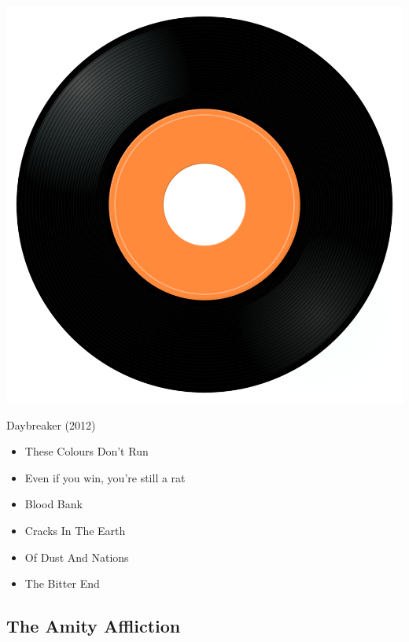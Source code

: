 \begin{minipage}[t]{0.25\textwidth}\vspace{0pt}
\captionsetup{type=figure}
\includegraphics[width=\textwidth]{Images/cover.png}
\caption*{Daybreaker (2012)}
\end{minipage}
\begin{minipage}[t]{0.25\textwidth}\vspace{0pt}
\begin{itemize}[nosep,leftmargin=1em,labelwidth=*,align=left]
	\setlength{\itemsep}{0pt}
	\item These Colours Don’t Run
	\item Even if you win, you're still a rat
	\item Blood Bank
	\item Cracks In The Earth
	\item Of Dust And Nations
	\item The Bitter End
\end{itemize}
\end{minipage}

\subsection{The Amity Affliction}

